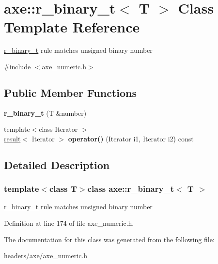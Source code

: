 \hypertarget{classaxe_1_1r__binary__t}{\section{axe\+:\+:r\+\_\+binary\+\_\+t$<$ T $>$ Class Template Reference}
\label{classaxe_1_1r__binary__t}
}


\hyperlink{classaxe_1_1r__binary__t}{r\+\_\+binary\+\_\+t} rule matches unsigned binary number  




{\ttfamily \#include $<$axe\+\_\+numeric.\+h$>$}

\subsection*{Public Member Functions}
\begin{DoxyCompactItemize}
\item 
\hypertarget{classaxe_1_1r__binary__t_aaab6671d37e81965bd0a1474c2d2e907}{{\bfseries r\+\_\+binary\+\_\+t} (T \&number)}\label{classaxe_1_1r__binary__t_aaab6671d37e81965bd0a1474c2d2e907}

\item 
\hypertarget{classaxe_1_1r__binary__t_ab27457a8f8cab1123dccc37ae1406b60}{{\footnotesize template$<$class Iterator $>$ }\\\hyperlink{structaxe_1_1result}{result}$<$ Iterator $>$ {\bfseries operator()} (Iterator i1, Iterator i2) const }\label{classaxe_1_1r__binary__t_ab27457a8f8cab1123dccc37ae1406b60}

\end{DoxyCompactItemize}


\subsection{Detailed Description}
\subsubsection*{template$<$class T$>$class axe\+::r\+\_\+binary\+\_\+t$<$ T $>$}

\hyperlink{classaxe_1_1r__binary__t}{r\+\_\+binary\+\_\+t} rule matches unsigned binary number 

Definition at line 174 of file axe\+\_\+numeric.\+h.



The documentation for this class was generated from the following file\+:\begin{DoxyCompactItemize}
\item 
headers/axe/axe\+\_\+numeric.\+h\end{DoxyCompactItemize}
